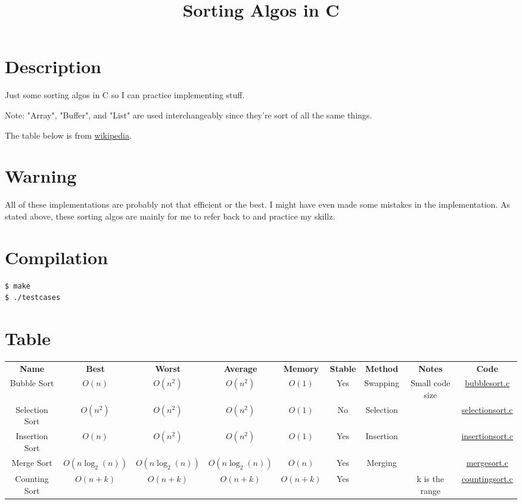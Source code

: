 \documentclass{article}
\title{Sorting Algos in C}
\date{}
\begin{document}
\maketitle
\section{Description}
Just some sorting algos in C so I can practice implementing stuff. \newline

Note: "Array", "Buffer", and "List" are used interchangeably since they're sort of all the same things. \newline

The table below is from \href{https://en.wikipedia.org/wiki/Sorting_algorithm}{wikipedia}. \newline

\section{Warning}
All of these implementations are probably not that efficient or the best. I might have even made some mistakes in the implementation.  
As stated above, these sorting algos are mainly for me to refer back to and practice my skillz.

\section{Compilation}

\begin{verbatim} 
$ make
$ ./testcases
\end{verbatim}

\section{Table}
\begin{center}
    \begin{tabular}{ |c|c|c|c|c|c|c|c|c| }
    \hline
    \textbf{Name} & \textbf{Best} & \textbf{Worst} & \textbf{Average} & \textbf{Memory} & \textbf{Stable} & \textbf{Method} & \textbf{Notes} & \textbf{Code}\\
        Bubble Sort & $O(n)$ & $O(n^2)$ & $O(n^2)$ & $O(1)$ & Yes & Swapping & Small code size & \href{algos/bubblesort.c}{bubblesort.c} \\
        Selection Sort & $O(n^2)$ & $O(n^2)$ & $O(n^2)$ & $O(1)$ & No & Selection & & \href{algos/selectionsort.c}{selectionsort.c} \\
        Insertion Sort & $O(n)$ & $O(n^2)$ & $O(n^2)$ & $O(1)$ & Yes & Insertion & & \href{algos/insertionsort.c}{insertionsort.c} \\
        Merge Sort & $O(n \log_2(n))$ & $O(n \log_2(n))$ & $O(n \log_2(n)) $ & $O(n)$ & Yes & Merging & & \href{algos/mergesort.c}{mergesort.c} \\
        Counting Sort & $O(n + k)$ & $O(n + k)$ & $O(n + k) $ & $O(n + k)$ & Yes &  & k is the range & \href{algos/countingsort.c}{countingsort.c} \\
    \hline
\end{tabular}
\end{center}
\end{document}
